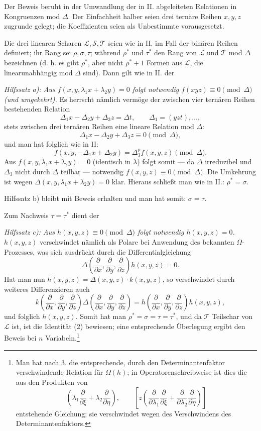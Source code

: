 \documentclass[11pt]{article}
\begin{document}
Der Beweis beruht in der Umwandlung der in II. abgeleiteten Relationen in Kongruenzen mod $\Delta$. Der Einfachheit halber seien drei ternäre Reihen $x,y,z$ zugrunde gelegt; die Koeffizienten seien als Unbestimmte vorausgesetzt.

Die drei linearen Scharen $\mathcal L,\mathcal S,\mathcal T$ seien wie in II. im Fall der binären Reihen definiert; ihr Rang sei $\rho,\sigma,\tau$; während $\rho^*$ und $\tau^*$ den Rang von $\mathcal L$ und $\mathcal T$ mod $\Delta$ bezeichnen (d. h. es gibt $\rho^*$, aber nicht $\rho^*+1$ Formen aus $\mathcal L$, die linearunabhängig mod $\Delta$ sind). Dann gilt wie in II. der

\emph{Hilfssatz a): Aus $f(x,y,\lambda_1x+\lambda_2y)=0$ folgt notwendig $f(xyz)\equiv0\pmod{\Delta}$ (und umgekehrt).} Es herrscht nämlich vermöge der zwischen vier ternären Reihen bestehenden Relation
\[
  \Delta_1x-\Delta_2y+\Delta_3z=\Delta t,
  \qquad \Delta_1=(yzt),\ldots,
\]
stets zwischen drei ternären Reihen eine lineare Relation mod $\Delta$:
\[
  \Delta_1x-\Delta_2y+\Delta_3z\equiv0\pmod{\Delta},
\]
und man hat folglich wie in II:
\[
  f(x,y,-\Delta_1x+\Delta_2y)=\Delta_3^p f(x,y,z)\pmod{\Delta}.
\]
Aus $f(x,y,\lambda_1x+\lambda_2y)=0$ (identisch in $\lambda$) folgt somit --- da $\Delta$ irreduzibel und $\Delta_3$ nicht durch $\Delta$ teilbar --- notwendig $f(x,y,z)\equiv0\pmod{\Delta}$. Die Umkehrung ist wegen $\Delta(x,y,\lambda_1x+\lambda_2y)=0$ klar. Hieraus schließt man wie in II.: $\rho^*=\sigma$.

Hilfssatz b) bleibt mit Beweis erhalten und man hat somit: $\sigma=\tau$.

Zum Nachweis $\tau=\tau^*$ dient der

\emph{Hilfssatz c): Aus $h(x,y,z)\equiv0\pmod{\Delta}$ folgt notwendig $h(x,y,z)=0$.}
$h(x,y,z)$ verschwindet nämlich als Polare bei Anwendung des bekannten $\Omega$-Prozesses, was sich ausdrückt durch die Differentialgleichung
\[
  \Delta\!\left(\frac{\partial}{\partial x},\frac{\partial}{\partial y},\frac{\partial}{\partial z}\right)h(x,y,z)=0.
\]
Hat man nun $h(x,y,z)=\Delta(x,y,z)\cdot k(x,y,z)$, so verschwindet durch weiteres Differenzieren auch
\[
  k\!\left(\frac{\partial}{\partial x},\frac{\partial}{\partial y},\frac{\partial}{\partial z}\right)
  \Delta\!\left(\frac{\partial}{\partial x},\frac{\partial}{\partial y},\frac{\partial}{\partial z}\right)
  =
  h\!\left(\frac{\partial}{\partial x},\frac{\partial}{\partial y},\frac{\partial}{\partial z}\right)h(x,y,z),
\]
und folglich $h(x,y,z)$. Somit hat man $\rho^*=\sigma=\tau=\tau^*$, und da $\mathcal T$ Teilschar von $\mathcal L$ ist, ist die Identität (2) bewiesen; eine entsprechende Überlegung ergibt den Beweis bei $n$ Variabeln.\footnote{Man hat nach 3. die entsprechende, durch den Determinantenfaktor verschwindende Relation für $\Omega(h)$; in Operatorenschreibweise ist dies die aus den Produkten von
\[
 \left(\lambda_1\frac{\partial}{\partial \xi}+\lambda_2\frac{\partial}{\partial \eta}\right),
 \qquad
 \left[z\left(\frac{\partial}{\partial\lambda_1}\frac{\partial}{\partial \xi}
 +\frac{\partial}{\partial\lambda_2}\frac{\partial}{\partial \eta}\right)\right]
\]
entstehende Gleichung; sie verschwindet wegen des Verschwindens des Determinantenfaktors.}
\end{document}
